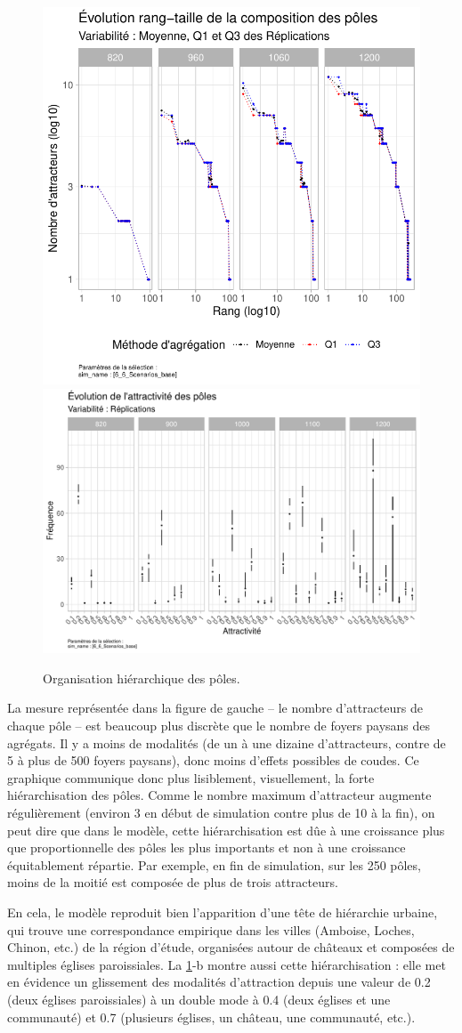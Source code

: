 \begin{figure}[H]
	\centering
	\includegraphics[width=.405\linewidth]{img/results_6_6/Poles_RT_Haut.pdf}
	\includegraphics[width=.58\linewidth]{img/results_6_6/Poles_Attrac_Haut.pdf}
	\caption[Hiérarchie des pôles.]{Organisation hiérarchique des pôles.}
	\label{fig:results-rt-poles}
\end{figure}

La mesure représentée dans la figure de gauche -- le nombre d'attracteurs de chaque pôle -- est beaucoup plus \og discrète\fg{} que le nombre de foyers paysans des agrégats.
Il y a moins de modalités (de un à une dizaine d'attracteurs, contre de 5 à plus de 500 foyers paysans), donc moins d'effets possibles de coudes.
Ce graphique communique donc plus lisiblement, visuellement, la forte hiérarchisation des pôles.
Comme le nombre maximum d'attracteur augmente régulièrement (environ 3 en début de simulation contre plus de 10 à la fin), on peut dire que dans le modèle, cette hiérarchisation est dûe à une croissance plus que proportionnelle des pôles les plus importants et non à une croissance équitablement répartie.
Par exemple, en fin de simulation, sur les 250 pôles, moins de la moitié est composée de plus de trois attracteurs.

En cela, le modèle reproduit bien l'apparition d'une tête de hiérarchie urbaine, qui trouve une correspondance empirique dans les villes (Amboise, Loches, Chinon, etc.) de la région d'étude, organisées autour de châteaux et composées de multiples églises paroissiales.
La \cref{fig:results-rt-poles}-b montre aussi cette hiérarchisation : elle met en évidence un glissement des modalités d'attraction depuis une valeur de 0.2 (deux églises paroissiales) à un double mode à 0.4 (deux églises et une communauté) et 0.7 (plusieurs églises, un château, une communauté, etc.).


